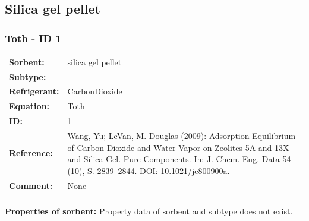 \subsection{Silica gel pellet }
%
\subsubsection{Toth - ID 1}
%
\begin{tabular}[l]{|lp{11.5cm}|}
\hline
\addlinespace

\textbf{Sorbent:} & silica gel pellet \\
\textbf{Subtype:} &  \\
\textbf{Refrigerant:} & CarbonDioxide \\
\textbf{Equation:} & Toth \\
\textbf{ID:} & 1 \\
\textbf{Reference:} & Wang, Yu; LeVan, M. Douglas (2009): Adsorption Equilibrium of Carbon Dioxide and Water Vapor on Zeolites 5A and 13X and Silica Gel. Pure Components. In: J. Chem. Eng. Data 54 (10), S. 2839–2844. DOI: 10.1021/je800900a. \\
\textbf{Comment:} & None \\

\addlinespace
\hline
\end{tabular}
\newline

\textbf{Properties of sorbent:}
\newline
%
Property data of sorbent and subtype does not exist.

